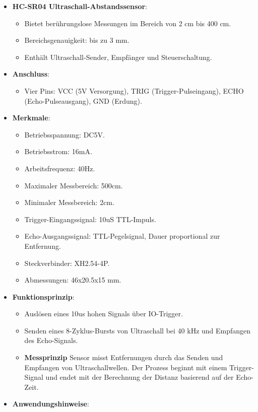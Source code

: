 \documentclass{vorlage-design-main}
\begin{document}
\begin{itemize}

\item
  \textbf{HC-SR04 Ultraschall-Abstandssensor}:

  \begin{itemize}
  
  \item
    Bietet berührungslose Messungen im Bereich von 2 cm bis 400 cm.
  \item
    Bereichsgenauigkeit: bis zu 3 mm.
  \item
    Enthält Ultraschall-Sender, Empfänger und Steuerschaltung.
  \end{itemize}
\item
  \textbf{Anschluss}:

  \begin{itemize}
  
  \item
    Vier Pins: VCC (5V Versorgung), TRIG (Trigger-Pulseingang), ECHO
    (Echo-Pulseausgang), GND (Erdung).
  \end{itemize}
\item
  \textbf{Merkmale}:

  \begin{itemize}
  
  \item
    Betriebsspannung: DC5V.
  \item
    Betriebsstrom: 16mA.
  \item
    Arbeitsfrequenz: 40Hz.
  \item
    Maximaler Messbereich: 500cm.
  \item
    Minimaler Messbereich: 2cm.
  \item
    Trigger-Eingangssignal: 10uS TTL-Impuls.
  \item
    Echo-Ausgangssignal: TTL-Pegelsignal, Dauer proportional zur
    Entfernung.
  \item
    Steckverbinder: XH2.54-4P.
  \item
    Abmessungen: 46x20.5x15 mm.
  \end{itemize}
\item
  \textbf{Funktionsprinzip}:

  \begin{itemize}
  
  \item
    Auslösen eines 10us hohen Signals über IO-Trigger.
  \item
    Senden eines 8-Zyklus-Bursts von Ultraschall bei 40 kHz und
    Empfangen des Echo-Signals.
  \item
    \textbf{Messprinzip} Sensor misst Entfernungen durch das Senden und
    Empfangen von Ultraschallwellen. Der Prozess beginnt mit einem
    Trigger-Signal und endet mit der Berechnung der Distanz basierend
    auf der Echo-Zeit.
  \end{itemize}
\item
  \textbf{Anwendungshinweise}:


\end{itemize}
\end{document}
